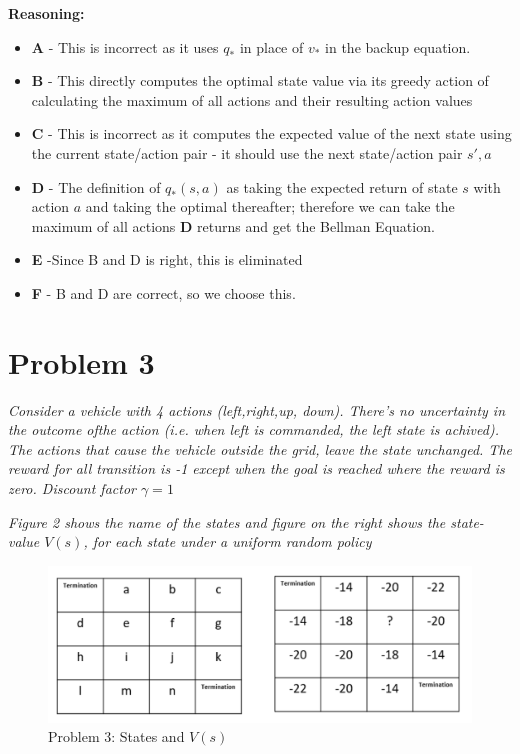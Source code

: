 \documentclass{article}
\begin{document}
\textbf{Reasoning:}

\begin{itemize}
    \item \textbf{A} - This is incorrect as it uses $q_*$ in place of $v_*$ in the backup equation.
    \item \textbf{B} - This directly computes the optimal state value via its greedy action of calculating the maximum of all actions and their resulting action values
    \item \textbf{C} - This is incorrect as it computes the expected value of the next state using the current state/action pair - it should use the next state/action pair $s',a$
    \item \textbf{D} - The definition of $q_*(s,a)$ as taking the expected return of state $s$ with action $a$ and taking the optimal thereafter; therefore we can take the maximum of all actions \textbf{D} returns and get the Bellman Equation.
    \item \textbf{E} -Since B and D is right, this is eliminated
    \item \textbf{F} - B and D are correct, so we choose this.
\end{itemize}

\section*{Problem 3}

\textit{Consider a vehicle with 4 actions (left,right,up, down). There’s no uncertainty in the outcome ofthe action (i.e. when left is commanded, the left state is achived). The actions that cause the vehicle outside the grid, leave the state unchanged. The reward for all transition is -1 except when the goal is reached where the reward is zero. Discount factor $\gamma = 1$}

\textit{Figure 2 shows the name of the states and figure on the right shows the state-value $V(s)$, for each state under a uniform random policy}

\begin{figure}
    \centering
    \includegraphics[width=.8\linewidth]{imgs/midterm.3.png}
    \caption{Problem 3: States and $V(s)$}
\end{figure}
\end{document}
